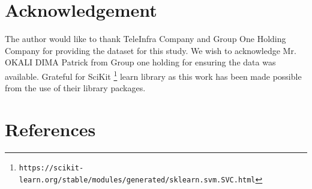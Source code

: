 \documentclass[a4paper,fleqn]{cas-dc}
\begin{document}
\section{Acknowledgement }
The author would like to thank TeleInfra Company and Group One Holding Company for providing the dataset for this study. We wish to acknowledge Mr. OKALI DIMA Patrick from Group one holding for ensuring the data was available. Grateful for SciKit \footnote{{\tt https://scikit-learn.org/stable/modules/generated/sklearn.svm.SVC.html}} learn library as this work has been made possible from the use of their library packages.
\section{References} \label{sec:references}
 
% 
% 
% 
\end{document}
